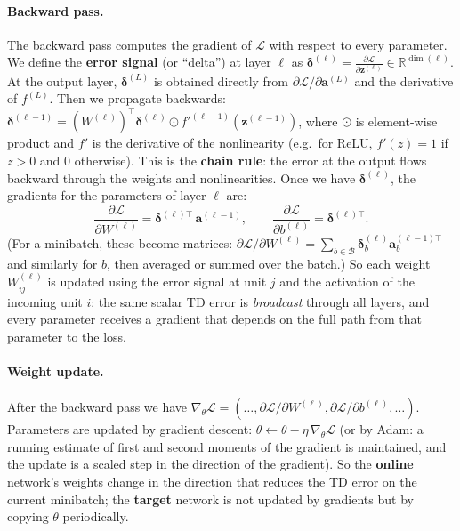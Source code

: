 \documentclass[11pt]{article}
\begin{document}
\paragraph{Backward pass.} The backward pass computes the gradient of $\mathcal{L}$ with respect to every parameter. We define the \textbf{error signal} (or ``delta'') at layer $\ell$ as $\boldsymbol{\delta}^{(\ell)} = \frac{\partial \mathcal{L}}{\partial \mathbf{z}^{(\ell)}} \in \mathbb{R}^{\dim(\ell)}$. At the output layer, $\boldsymbol{\delta}^{(L)}$ is obtained directly from $\partial \mathcal{L} / \partial \mathbf{a}^{(L)}$ and the derivative of $f^{(L)}$. Then we propagate backwards: $\boldsymbol{\delta}^{(\ell-1)} = (W^{(\ell)})^\top \boldsymbol{\delta}^{(\ell)} \odot f'^{(\ell-1)}(\mathbf{z}^{(\ell-1)})$, where $\odot$ is element-wise product and $f'$ is the derivative of the nonlinearity (e.g.\ for ReLU, $f'(z) = 1$ if $z>0$ and $0$ otherwise). This is the \textbf{chain rule}: the error at the output flows backward through the weights and nonlinearities. Once we have $\boldsymbol{\delta}^{(\ell)}$, the gradients for the parameters of layer $\ell$ are:
\begin{equation}
\frac{\partial \mathcal{L}}{\partial W^{(\ell)}} = \boldsymbol{\delta}^{(\ell)\top} \,\mathbf{a}^{(\ell-1)}, \qquad \frac{\partial \mathcal{L}}{\partial b^{(\ell)}} = \boldsymbol{\delta}^{(\ell)\top}.
\end{equation}
(For a minibatch, these become matrices: $\partial \mathcal{L} / \partial W^{(\ell)} = \sum_{b \in \mathcal{B}} \boldsymbol{\delta}^{(\ell)}_b \mathbf{a}^{(\ell-1)\top}_b$ and similarly for $b$, then averaged or summed over the batch.) So each weight $W^{(\ell)}_{ij}$ is updated using the error signal at unit $j$ and the activation of the incoming unit $i$: the same scalar TD error is \emph{broadcast} through all layers, and every parameter receives a gradient that depends on the full path from that parameter to the loss.

\paragraph{Weight update.} After the backward pass we have $\nabla_\theta \mathcal{L} = (\ldots, \partial \mathcal{L}/\partial W^{(\ell)}, \partial \mathcal{L}/\partial b^{(\ell)}, \ldots)$. Parameters are updated by gradient descent: $\theta \leftarrow \theta - \eta \, \nabla_\theta \mathcal{L}$ (or by Adam: a running estimate of first and second moments of the gradient is maintained, and the update is a scaled step in the direction of the gradient). So the \textbf{online} network's weights change in the direction that reduces the TD error on the current minibatch; the \textbf{target} network is not updated by gradients but by copying $\theta$ periodically.
\end{document}
